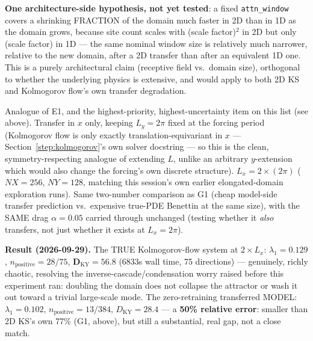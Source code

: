 \documentclass[11pt]{article}
\begin{document}
\begin{description}[style=nextline,leftmargin=1.2em]
\textbf{One architecture-side hypothesis, not yet tested}: a fixed
\texttt{attn\_window} covers a shrinking FRACTION of the domain much
faster in 2D than in 1D as the domain grows, because site count scales
with (scale factor)$^2$ in 2D but only (scale factor) in 1D --- the same
nominal window size is relatively much narrower, relative to the new
domain, after a 2D transfer than after an equivalent 1D one. This is a
purely architectural claim (receptive field vs.\ domain size), orthogonal
to whether the underlying physics is extensive, and would apply to both
2D KS and Kolmogorov flow's own transfer degradation.

\item[G2 --- Ground-truth L-transfer, Kolmogorov flow.] \label{exp:g2}
Analogue of E1, and the highest-priority, highest-uncertainty item on
this list (see above). Transfer in $x$ only, keeping $L_y=2\pi$ fixed at
the forcing period (Kolmogorov flow is only exactly translation-equivariant
in $x$ --- Section~\ref{step:kolmogorov}'s own solver docstring --- so this
is the clean, symmetry-respecting analogue of extending $L$, unlike an
arbitrary $y$-extension which would also change the forcing's own
discrete structure). $L_x = 2\times(2\pi)$ ($NX=256$, $NY=128$, matching
this session's own earlier elongated-domain exploration runs). Same
two-number comparison as G1 (cheap model-side transfer prediction vs.\
expensive true-PDE Benettin at the same size), with the SAME drag
$\alpha=0.05$ carried through unchanged (testing whether it \emph{also}
transfers, not just whether it exists at $L_x=2\pi$).

\textbf{Result (2026-09-29).} The TRUE Kolmogorov-flow system at
$2\times L_x$: $\lambda_1=0.129$, $n_{\mathrm{positive}}=28/75$,
$\boldsymbol{D_{\mathrm{KY}}=56.8}$ ($6833$s wall time, 75 directions) ---
genuinely, richly chaotic, resolving the inverse-cascade/condensation
worry raised before this experiment ran: doubling the domain does not
collapse the attractor or wash it out toward a trivial large-scale mode.
The zero-retraining transferred MODEL: $\lambda_1=0.102$,
$n_{\mathrm{positive}}=13/384$, $D_{\mathrm{KY}}=28.4$ --- a
\textbf{50\% relative error}: smaller than 2D KS's own 77\% (G1, above),
but still a substantial, real gap, not a close match.


\end{description}
\end{document}
